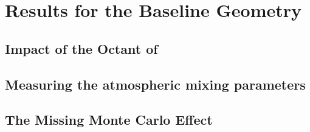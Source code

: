 \section{Results for the Baseline Geometry}
\label{sec:results_baseline}



\subsection{Impact of the Octant of }
\label{sec:results_octant}

\subsection{Measuring the atmospheric mixing parameters}
\label{sec:results_atmosperic}

\subsection{The Missing Monte Carlo Effect}
\label{sec:results_mcstats}